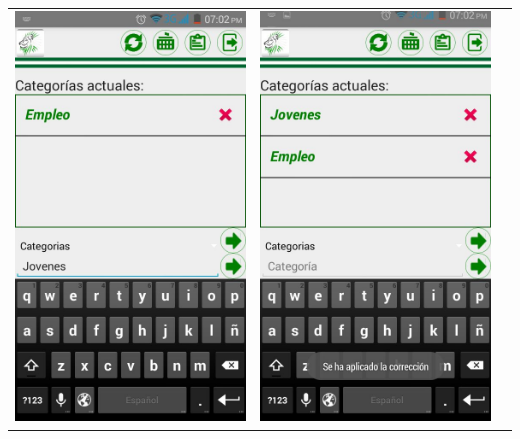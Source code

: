 \begin{tabular}{p{7cm}p{8mm}p{7cm}}


\includegraphics[width=6.5cm]{./android/imagenes/cat5.jpg}

&

\includegraphics[width=6.5cm]{./android/imagenes/cat6.jpg}

\\

\end{tabular}

